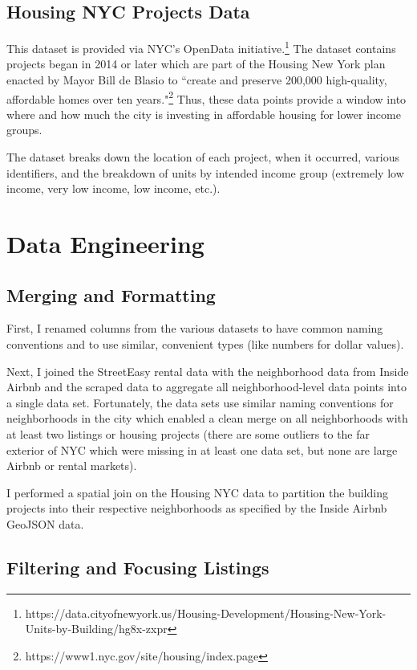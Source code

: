 \documentclass[12pt]{article}
\begin{document}
\subsection{Housing NYC Projects Data}

This dataset is provided via NYC's OpenData initiative.\footnote{https://data.cityofnewyork.us/Housing-Development/Housing-New-York-Units-by-Building/hg8x-zxpr} The dataset contains projects began in 2014 or later which are part of the Housing New York plan enacted by Mayor Bill de Blasio to ``create and preserve 200,000 high-quality, affordable homes over ten years."\footnote{https://www1.nyc.gov/site/housing/index.page} Thus, these data points provide a window into where and how much the city is investing in affordable housing for lower income groups.

The dataset breaks down the location of each project, when it occurred, various identifiers, and the breakdown of units by intended income group (extremely low income, very low income, low income, etc.).

\section{Data Engineering}

\subsection{Merging and Formatting}

First, I renamed columns from the various datasets to have common naming conventions and to use similar, convenient types (like numbers for dollar values).

Next, I joined the StreetEasy rental data with the neighborhood data from Inside Airbnb and the scraped data to aggregate all neighborhood-level data points into a single data set. Fortunately, the data sets use similar naming conventions for neighborhoods in the city which enabled a clean merge on all neighborhoods with at least two listings or housing projects (there are some outliers to the far exterior of NYC which were missing in at least one data set, but none are large Airbnb or rental markets).

I performed a spatial join on the Housing NYC data to partition the building projects into their respective neighborhoods as specified by the Inside Airbnb GeoJSON data.

\subsection{Filtering and Focusing Listings}
\end{document}
